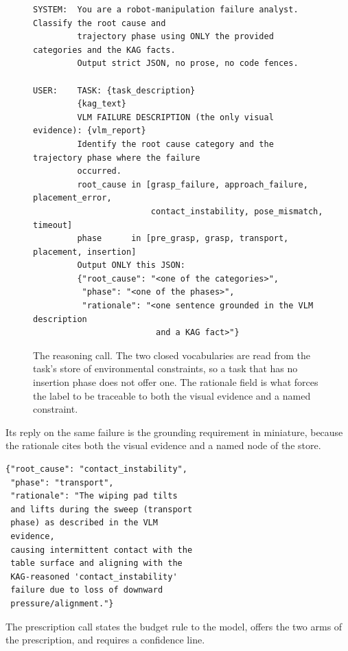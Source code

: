 \documentclass[letterpaper]{article}
\begin{document}
\begin{figure}[t]
\centering
\begin{minipage}{\textwidth}
\begin{verbatim}
SYSTEM:  You are a robot-manipulation failure analyst. Classify the root cause and
         trajectory phase using ONLY the provided categories and the KAG facts.
         Output strict JSON, no prose, no code fences.

USER:    TASK: {task_description}
         {kag_text}
         VLM FAILURE DESCRIPTION (the only visual evidence): {vlm_report}
         Identify the root cause category and the trajectory phase where the failure
         occurred.
         root_cause in [grasp_failure, approach_failure, placement_error,
                        contact_instability, pose_mismatch, timeout]
         phase      in [pre_grasp, grasp, transport, placement, insertion]
         Output ONLY this JSON:
         {"root_cause": "<one of the categories>",
          "phase": "<one of the phases>",
          "rationale": "<one sentence grounded in the VLM description
                         and a KAG fact>"}
\end{verbatim}
\end{minipage}
\caption{The reasoning call. The two closed vocabularies are read from the task's store
of environmental constraints, so a task that has no insertion phase does not offer one.
The rationale field is what forces the label to be traceable to both the visual evidence
and a named constraint.}
\label{fig:prompt-reason}
\end{figure}

Its reply on the same failure is the grounding requirement in miniature, because the
rationale cites both the visual evidence and a named node of the store.

\begin{verbatim}
{"root_cause": "contact_instability",
 "phase": "transport",
 "rationale": "The wiping pad tilts
 and lifts during the sweep (transport
 phase) as described in the VLM
 evidence,
 causing intermittent contact with the
 table surface and aligning with the
 KAG-reasoned 'contact_instability'
 failure due to loss of downward
 pressure/alignment."}
\end{verbatim}

The prescription call states the budget rule to the model, offers the two arms of the
prescription, and requires a confidence line.
\end{document}
